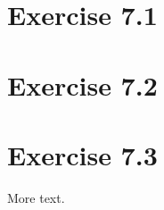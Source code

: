 \documentclass[11pt]{article} %
\begin{document}
\section*{Exercise 7.1}

\section*{Exercise 7.2}

\section*{Exercise 7.3}

More text.
\end{document}
